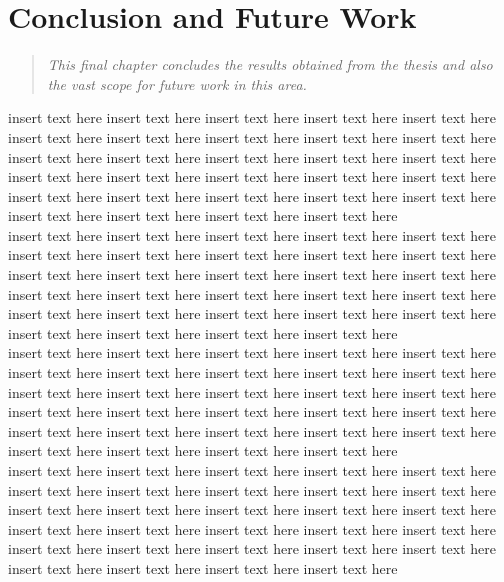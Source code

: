 \chapter{Conclusion and Future Work}
\begin{quote} 
\it This final chapter concludes the results obtained from the thesis and also the vast scope for future work in this area.
\end{quote}

insert text here insert text here insert text here insert text here insert text here
insert text here insert text here insert text here insert text here insert text here insert text here insert text here insert text here insert text here insert text here insert text here insert text here insert text here insert text here insert text here insert text here insert text here insert text here insert text here insert text here insert text here insert text here insert text here insert text here   \\

insert text here insert text here insert text here insert text here insert text here
insert text here insert text here insert text here insert text here insert text here insert text here insert text here insert text here insert text here insert text here insert text here insert text here insert text here insert text here insert text here insert text here insert text here insert text here insert text here insert text here insert text here insert text here insert text here insert text here   \\

insert text here insert text here insert text here insert text here insert text here
insert text here insert text here insert text here insert text here insert text here insert text here insert text here insert text here insert text here insert text here insert text here insert text here insert text here insert text here insert text here insert text here insert text here insert text here insert text here insert text here insert text here insert text here insert text here insert text here   \\

insert text here insert text here insert text here insert text here insert text here
insert text here insert text here insert text here insert text here insert text here insert text here insert text here insert text here insert text here insert text here insert text here insert text here insert text here insert text here insert text here insert text here insert text here insert text here insert text here insert text here insert text here insert text here insert text here insert text here   \\




